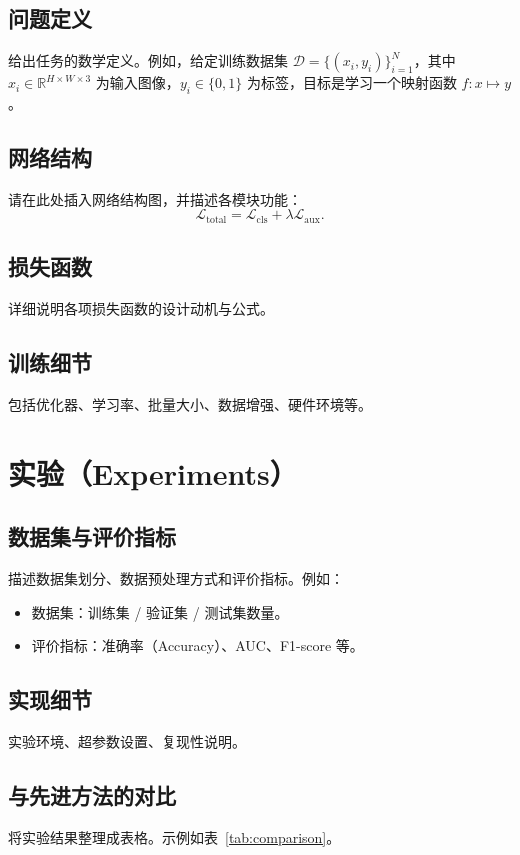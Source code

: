 \documentclass[12pt,a4paper]{article}
\begin{document}
\subsection{问题定义}
给出任务的数学定义。例如，给定训练数据集 $\mathcal{D}=\{(x_i, y_i)\}_{i=1}^{N}$，其中 $x_i \in \mathbb{R}^{H \times W \times 3}$ 为输入图像，$y_i \in \{0, 1\}$ 为标签，目标是学习一个映射函数 $f: x \mapsto y$。

\subsection{网络结构}
请在此处插入网络结构图，并描述各模块功能：
\begin{equation}
    \mathcal{L}_{\text{total}} = \mathcal{L}_{\text{cls}} + \lambda \mathcal{L}_{\text{aux}}.
\end{equation}

\subsection{损失函数}
详细说明各项损失函数的设计动机与公式。

\subsection{训练细节}
包括优化器、学习率、批量大小、数据增强、硬件环境等。

\section{实验（Experiments）}
\subsection{数据集与评价指标}
描述数据集划分、数据预处理方式和评价指标。例如：
\begin{itemize}
    \item 数据集：训练集 / 验证集 / 测试集数量。
    \item 评价指标：准确率（Accuracy）、AUC、F1-score 等。
\end{itemize}

\subsection{实现细节}
实验环境、超参数设置、复现性说明。

\subsection{与先进方法的对比}
将实验结果整理成表格。示例如表~\ref{tab:comparison}。
\end{document}
